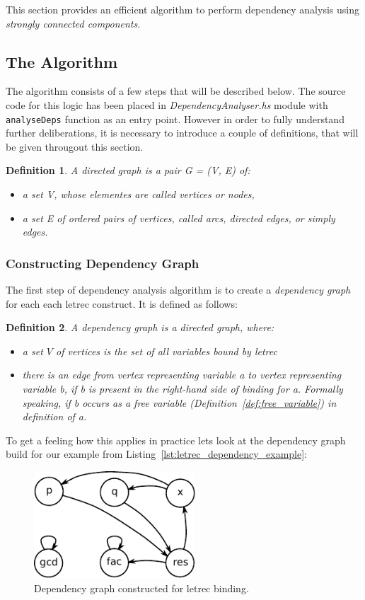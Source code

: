 \documentclass[12pt,a4paper]{report}
\newtheorem{definition}{Definition}[chapter]
\begin{document}
This section provides an efficient algorithm to perform dependency analysis
using \textit{strongly connected components}.

\subsection{The Algorithm}
The algorithm consists of a few steps that will be described below. The source
code for this logic has been placed in \textit{DependencyAnalyser.hs} module
with \texttt{analyseDeps} function as an entry point. However in order to fully
understand further deliberations, it is necessary to introduce a couple of
definitions, that will be given througout this section.
\begin{definition}
A directed graph is a pair G = (V, E) of:
\begin{itemize}
  \item a set V, whose elementes are called vertices or nodes,
  \item a set E of ordered pairs of vertices, called arcs, directed edges, or
    simply edges.
\end{itemize}
\end{definition}

\subsubsection{Constructing Dependency Graph}
The first step of dependency analysis algorithm is to create a
\textit{dependency graph} for each each letrec construct. It is
defined as follows:
\begin{definition}
A dependency graph is a directed graph, where:
\begin{itemize}
  \item a set $V$ of vertices is the set of all variables bound by
    letrec
  \item there is an edge from vertex representing variable a to vertex
    representing variable b, if b is present in the right-hand side of
    binding for a. Formally speaking, if b occurs as a free variable
    (Definition~\ref{def:free_variable}) in definition of a.
\end{itemize}
\end{definition}

To get a feeling how this applies in practice lets look at the dependency graph
build for our example from Listing~\ref{lst:letrec_dependency_example}:

\vspace*{0.2in}
\begin{figure}[h!]
  \centering
  \includegraphics[height=4cm]{dependency_graph}
  \caption{Dependency graph constructed for letrec binding.}
  \label{fig:letrec_dependency_graph}
\end{figure}
\end{document}
